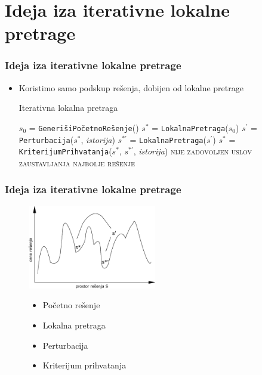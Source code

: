 \documentclass{beamer}
\newcommand{\sstar}[0]{$\textit{s}^*$}
\newcommand{\squote}[0]{$\textit{s}^\prime$}
\newcommand{\lokalna}[0]{\small{\texttt{LokalnaPretraga}}}
\newcommand{\kriterijum}[0]{\small{\texttt{KriterijumPrihvatanja}}}
\newcommand{\generisi}[0]{\small{\texttt{GenerišiPočetnoRešenje}}}
\newcommand{\perturbacija}[0]{\small{\texttt{Perturbacija}}}
\begin{document}
\section{Ideja iza iterativne lokalne pretrage}
\begin{frame}
	\frametitle{Ideja iza iterativne lokalne pretrage} 
  \begin{itemize}
    \item Koristimo samo podskup rešenja, dobijen od lokalne pretrage
    \begin{center}
      \begin{minipage}{1\linewidth}
        \begin{algorithm}[H]
      \caption{Iterativna lokalna pretraga}
      \label{alg:1}
      \begin{algorithmic}
      \STATE $\textit{s}_0$ = \generisi{}()
      \STATE \sstar{} = \lokalna{}($\textit{s}_0$)
      \REPEAT
      \STATE \squote{} = \perturbacija{}(\sstar{}, \textit{istorija})
      \STATE $\textit{s}^{*\prime}$ = \lokalna{}(\squote{})
      \STATE \sstar{} = \kriterijum{}(\sstar{}, $\textit{s}^{*\prime}$, \textit{istorija})
      \UNTIL \textsc{nije zadovoljen uslov zaustavljanja}\footnotemark
      \RETURN \textsc{najbolje rešenje}
      \end{algorithmic}
      \end{algorithm}
    \end{minipage}
    \end{center}
  \end{itemize}
\end{frame}

\begin{frame}[fragile]\frametitle{Ideja iza iterativne lokalne pretrage}
  \begin{figure}[h!]
    \centering
    \includegraphics[width=0.5\textwidth]{slika.eps}
    \begin{itemize}
      \item Početno rešenje
      \item Lokalna pretraga
      \item Perturbacija
      \item Kriterijum prihvatanja
    \end{itemize}
  \end{figure}
\end{frame}
\end{document}

